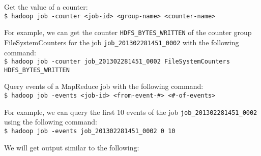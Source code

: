 Get the value of a counter: \\
\verb|$ hadoop job -counter <job-id> <group-name> <counter-name>|

For example, we can get the counter \verb|HDFS_BYTES_WRITTEN| of the counter group FileSystemCounters for the job \verb|job_201302281451_0002| with the following command: \\ 
\verb|$ hadoop job -counter job_201302281451_0002 FileSystemCounters HDFS_BYTES_WRITTEN| 

Query events of a MapReduce job with the following command: \\
\verb|$ hadoop job -events <job-id> <from-event-#> <#-of-events>|

For example, we can query the first 10 events of the job \verb|job_201302281451_0002| using the following command: \\
\verb|$ hadoop job -events job_201302281451_0002 0 10|

We will get output similar to the following:


